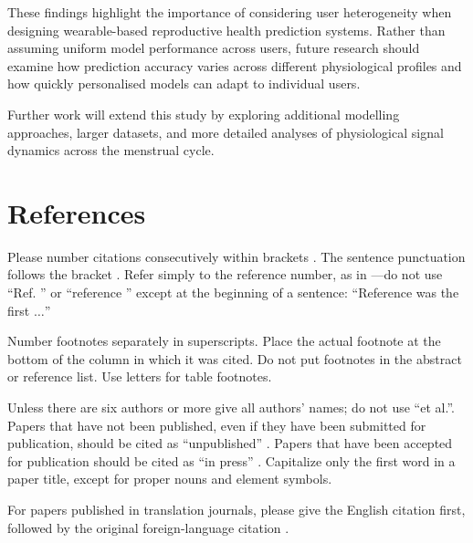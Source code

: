 \documentclass[conference]{IEEEtran}
\begin{document}
These findings highlight the importance of considering user heterogeneity when designing wearable-based reproductive health prediction systems. Rather than assuming uniform model performance across users, future research should examine how prediction accuracy varies across different physiological profiles and how quickly personalised models can adapt to individual users.

Further work will extend this study by exploring additional modelling approaches, larger datasets, and more detailed analyses of physiological signal dynamics across the menstrual cycle.

\section*{References}

Please number citations consecutively within brackets \cite{b1}. The 
sentence punctuation follows the bracket \cite{b2}. Refer simply to the reference 
number, as in \cite{b3}---do not use ``Ref. \cite{b3}'' or ``reference \cite{b3}'' except at 
the beginning of a sentence: ``Reference \cite{b3} was the first $\ldots$''

Number footnotes separately in superscripts. Place the actual footnote at 
the bottom of the column in which it was cited. Do not put footnotes in the 
abstract or reference list. Use letters for table footnotes.

Unless there are six authors or more give all authors' names; do not use 
``et al.''. Papers that have not been published, even if they have been 
submitted for publication, should be cited as ``unpublished'' \cite{b4}. Papers 
that have been accepted for publication should be cited as ``in press'' \cite{b5}. 
Capitalize only the first word in a paper title, except for proper nouns and 
element symbols.

For papers published in translation journals, please give the English 
citation first, followed by the original foreign-language citation \cite{b6}.
\end{document}
